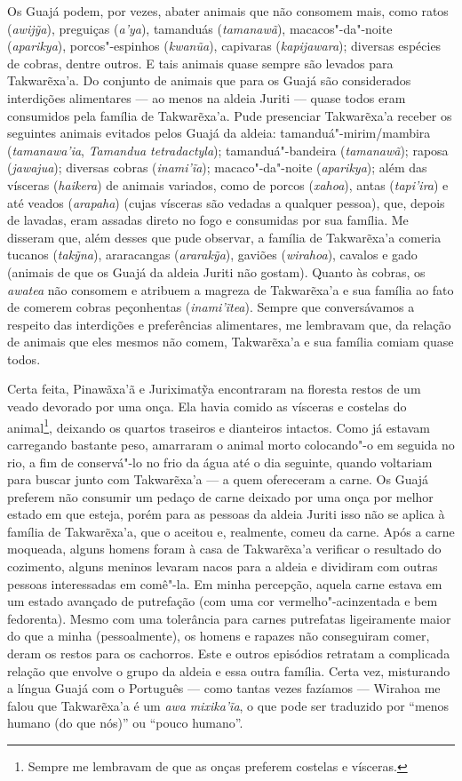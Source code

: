 Os Guajá podem, por vezes, abater animais que não consomem mais, como
ratos (\emph{awijỹa}), preguiças (\emph{a'ya}), tamanduás
(\emph{tamanawã}), macacos"-da"-noite (\emph{aparikya}), porcos"-espinhos
(\emph{kwanũa}), capivaras (\emph{kapijawara}); diversas espécies de
cobras, dentre outros. E tais animais quase sempre são levados para
Takwarẽxa'a. Do conjunto de animais que para os Guajá são considerados
interdições alimentares --- ao menos na aldeia Juriti --- quase todos eram
consumidos pela família de Takwarẽxa'a. Pude presenciar Takwarẽxa'a
receber os seguintes animais evitados pelos Guajá da aldeia:
tamanduá"-mirim/mambira (\emph{tamanawa'ia}, \emph{Tamandua
tetradactyla}); tamanduá"-bandeira (\emph{tamanawã}); raposa
(\emph{jawajua}); diversas cobras (\emph{inami'ĩa}); macaco"-da"-noite
(\emph{aparikya}); além das vísceras (\emph{haikera}) de animais
variados, como de porcos (\emph{xahoa}), antas (\emph{tapi'ira}) e até
veados (\emph{arapaha}) (cujas vísceras são vedadas a qualquer pessoa),
que, depois de lavadas, eram assadas direto no fogo e consumidas por sua
família. Me disseram que, além desses que pude observar, a família de
Takwarẽxa'a comeria tucanos (\emph{takỹna}), araracangas
(\emph{ararakỹa}), gaviões (\emph{wirahoa}), cavalos e gado (animais de
que os Guajá da aldeia Juriti não gostam). Quanto às cobras, os
\emph{awatea} não consomem e atribuem a magreza de Takwarẽxa'a e sua
família ao fato de comerem cobras peçonhentas (\emph{inami'ĩtea}).
Sempre que conversávamos a respeito das interdições e preferências
alimentares, me lembravam que, da relação de animais que eles mesmos não
comem, Takwarẽxa'a e sua família comiam quase todos.

Certa feita, Pinawãxa'ã e Juriximatỹa encontraram na floresta restos de
um veado devorado por uma onça. Ela havia comido as vísceras e costelas
do animal\footnote{Sempre me lembravam de que as onças preferem costelas
  e vísceras.}, deixando os quartos traseiros e dianteiros intactos.
Como já estavam carregando bastante peso, amarraram o animal morto
colocando"-o em seguida no rio, a fim de conservá"-lo no frio da água até
o dia seguinte, quando voltariam para buscar junto com Takwarẽxa'a --- a
quem ofereceram a carne. Os Guajá preferem não consumir um pedaço de
carne deixado por uma onça por melhor estado em que esteja, porém para
as pessoas da aldeia Juriti isso não se aplica à família de Takwarẽxa'a,
que o aceitou e, realmente, comeu da carne. Após a carne moqueada,
alguns homens foram à casa de Takwarẽxa'a verificar o resultado do
cozimento, alguns meninos levaram nacos para a aldeia e dividiram com
outras pessoas interessadas em comê"-la. Em minha percepção, aquela carne
estava em um estado avançado de putrefação (com uma cor
vermelho"-acinzentada e bem fedorenta). Mesmo com uma tolerância para
carnes putrefatas ligeiramente maior do que a minha (pessoalmente), os
homens e rapazes não conseguiram comer, deram os restos para os
cachorros. Este e outros episódios retratam a complicada relação que
envolve o grupo da aldeia e essa outra família. Certa vez, misturando a
língua Guajá com o Português --- como tantas vezes fazíamos --- Wirahoa me
falou que Takwarẽxa'a é um \emph{awa} \emph{mixika'ĩa}, o que pode ser
traduzido por ``menos humano (do que nós)'' ou ``pouco humano''.

